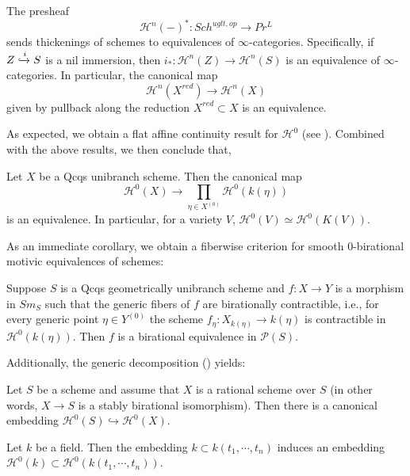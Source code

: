 \begin{inner-recall-star}
The presheaf $$\mathcal{H}^{n}(-)^*: Sch^{uglt,op}\to Pr^L$$ sends thickenings of schemes to equivalences of $\infty$-categories. Specifically, if $Z\xhookrightarrow{i} S$ is a nil immersion, then $i_*:  \mathcal{H}^{n}(Z) \to \mathcal{H}^{n}(S)$ is an equivalence of $\infty$-categories. In particular, the canonical map $$\mathcal{H}^{n}(X^{red})\to \mathcal{H}^{n}(X)$$ given by pullback along the reduction $X^{red}\subset X$ is an equivalence.
    \end{inner-recall-star}
As expected, we obtain a flat affine continuity result for $\mathcal{H}^0$ (see ). Combined with the above results, we then conclude that,
  \begin{inner-recall-star}
         Let $X$ be a Qcqs unibranch scheme. Then the canonical map $$\mathcal{H}^0(X)\to\underset{\eta\in X^{(0)}}{\prod}\mathcal{H}^0(k(\eta))$$ is an equivalence. In particular, for a variety $V$, $\mathcal{H}^0(V)\simeq\mathcal{H}^0(K(V))$.
     \end{inner-recall-star}
As an immediate corollary, we obtain a fiberwise criterion for smooth $0$-birational motivic equivalences of schemes:
\begin{inner-recall-star}
    Suppose $S$ is a Qcqs geometrically unibranch scheme and $f:X\to Y$ is a morphism in $Sm_S$ such that the generic fibers of $f$ are birationally contractible, i.e., for every generic point $\eta\in Y^{(0)}$ the scheme $f_\eta:X_{k(\eta)}\to k(\eta)$ is contractible in $\mathcal{H}^0(k(\eta))$. Then $f$ is a birational equivalence in $\mathcal{P}(S)$.
\end{inner-recall-star} 
Additionally, the generic decomposition () yields:
\begin{inner-recall-star}
Let $S$ be a scheme and assume that $X$ is a rational scheme over $S$ (in other words, $X\to S$ is a stably birational isomorphism). Then there is a canonical embedding $\mathcal{H}^0(S)\hookrightarrow \mathcal{H}^0(X)$.
    \end{inner-recall-star}
    
\begin{inner-recall-star}
   Let $k$ be a field. Then the embedding $k\subset k(t_1,\cdots,t_n) $ induces an embedding $\mathcal{H}^0(k)\subset \mathcal{H}^0(k(t_1,\cdots,t_n))$.
\end{inner-recall-star}
 
